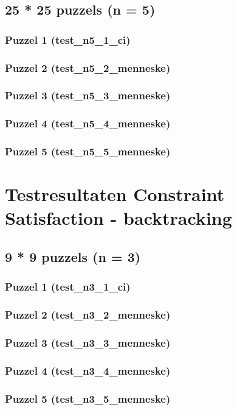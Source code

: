 \documentclass[]{report}
\begin{document}
\begin{appendices}
\section{25 * 25 puzzels (n = 5)}
\subsection{Puzzel 1 (test\_n5\_1\_ci)}

\subsection{Puzzel 2 (test\_n5\_2\_menneske)}
\subsection{Puzzel 3 (test\_n5\_3\_menneske)}
\subsection{Puzzel 4 (test\_n5\_4\_menneske)}
\subsection{Puzzel 5 (test\_n5\_5\_menneske)}

\chapter{Testresultaten Constraint Satisfaction - backtracking}
\section{9 * 9 puzzels (n = 3)}
\subsection{Puzzel 1 (test\_n3\_1\_ci)}

\subsection{Puzzel 2 (test\_n3\_2\_menneske)}
\subsection{Puzzel 3 (test\_n3\_3\_menneske)}
\subsection{Puzzel 4 (test\_n3\_4\_menneske)}
\subsection{Puzzel 5 (test\_n3\_5\_menneske)}

\end{appendices}
\end{document}
